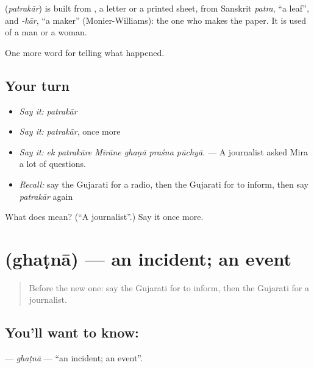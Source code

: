 \begin{cousinweb}
\textbf{} (\emph{patrakār}) is built from \textbf{}, a letter or a printed sheet, from Sanskrit \emph{patra}, \textquotedblleft{}a leaf\textquotedblright{}, and \emph{-kār}, \textquotedblleft{}a maker\textquotedblright{} (Monier-Williams): the one who makes the paper. It is used of a man or a woman.
\end{cousinweb}

\begin{grammarlens}[title={What you've built}]
One more word for telling what happened.
\end{grammarlens}

\subsection*{Your turn}
\begin{itemize}
\raggedright
  \item \emph{Say it:} \emph{patrakār}
  \item \emph{Say it:} \emph{patrakār}, once more
  \item \emph{Say it:} \emph{ek patrakāre Mīrāne ghaṇā praśna pūchyā.} — A journalist asked Mira a lot of questions.
  \item \emph{Recall:} say the Gujarati for a radio, then the Gujarati for to inform, then say \emph{patrakār} again
\end{itemize}

\begin{tcolorbox}[breakable,colback=teal!4,colframe=teal!35!black,title={Before you move on}]
What does  mean? (\textquotedblleft{}A journalist\textquotedblright{}.) Say it once more.
\end{tcolorbox}
\section[\texorpdfstring{\gu{ઘટના} (ghaṭnā)}{ઘટના (ghaṭnā)}]{ (ghaṭnā) — an incident; an event}

\label{lesson:GU-C312-ghatna}



\begin{quote}
Before the new one: say the Gujarati for to inform, then the Gujarati for a journalist.
\end{quote}

\subsection*{You'll want to know: }
\textbf{} — \emph{ghaṭnā} — \textquotedblleft{}an incident; an event\textquotedblright{}.

